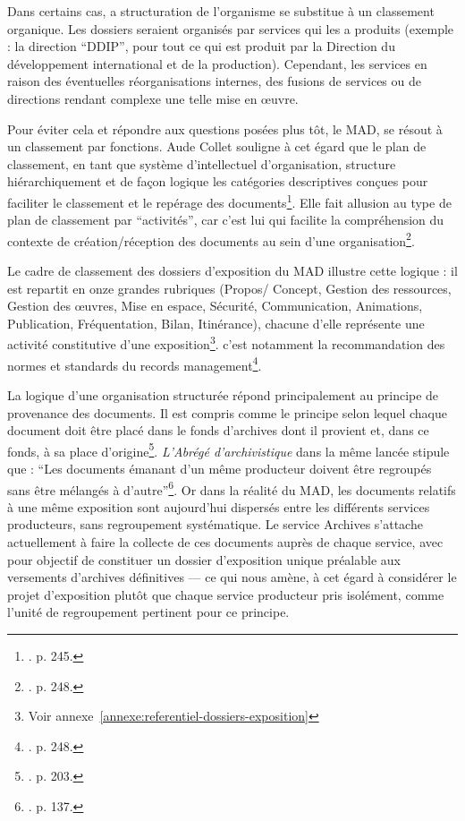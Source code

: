 Dans certains cas, a structuration de l'organisme se substitue à un classement organique. Les dossiers seraient organisés par services qui les a produits (exemple : la direction \enquote{DDIP}, pour tout ce qui est produit par la Direction du développement international et de la production). Cependant, les services en raison des éventuelles réorganisations internes, des fusions de services ou de directions rendant complexe une telle mise en œuvre. 

Pour éviter cela et répondre aux questions posées plus tôt, le MAD, se résout à un classement par fonctions. Aude Collet souligne à cet égard que le plan de classement, en tant que système d'intellectuel d'organisation, structure hiérarchiquement et de façon logique les catégories descriptives conçues pour faciliter le classement et le repérage des documents\footnote{\cite{collet2012}. p. 245.}. Elle fait allusion au type de plan de classement par \enquote{activités}, car c'est lui qui facilite la compréhension du contexte de création/réception des documents au sein d'une organisation\footnote{\cite{collet2012}. p. 248.}. 

Le cadre de classement des dossiers d’exposition du MAD illustre cette logique : il est repartit en onze grandes rubriques (Propos/ Concept, Gestion des ressources, Gestion des œuvres, Mise en espace, Sécurité, Communication, Animations, Publication, Fréquentation, Bilan, Itinérance), chacune d'elle représente une activité constitutive d'une exposition\footnote{Voir annexe~\ref{annexe:referentiel-dossiers-exposition}}. 
c'est notamment la recommandation des normes et standards du records management\footnote{\cite{collet2012}. p. 248.}.

La logique d'une organisation structurée répond principalement au principe de provenance des documents. Il est compris comme le principe selon lequel chaque document doit être placé dans le fonds d'archives dont il provient et, dans ce fonds, à sa place d'origine\footnote{\cite{lodolini1995}. p. 203.}. \textit{L'Abrégé d'archivistique} dans la même lancée stipule que : \enquote{Les documents émanant d'un même producteur doivent être regroupés sans être mélangés à d'autre}\footnote{\cite{aaf-abrege-2020}. p. 137.}. Or dans la réalité du MAD, les documents relatifs à une même exposition sont aujourd'hui dispersés entre les différents services producteurs, sans regroupement systématique. Le service Archives s'attache actuellement à faire la collecte de ces documents auprès de chaque service, avec pour objectif de constituer un dossier d'exposition unique préalable aux versements d'archives définitives — ce qui nous amène, à cet égard à considérer le projet d'exposition plutôt que chaque service producteur pris isolément, comme l'unité de regroupement pertinent pour ce principe.

